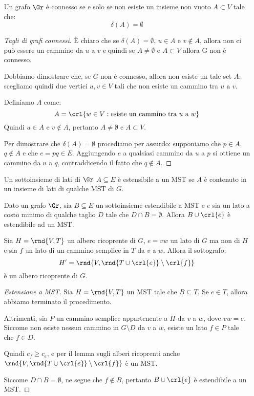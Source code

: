 \documentclass[\main/main.tex]{subfiles}
\begin{document}
\begin{theorem}
  Un grafo \(\Gr \) è connesso se e solo se non esiste un insieme non vuoto \(A \subset V\) tale che:
  \[
    \delta(A) = \emptyset
  \]
\end{theorem}
\begin{proof}[Tagli di grafi connessi]
  È chiaro che se \(\delta(A) = \emptyset \), \(u \in A\) e \(v \not\in A\), allora non ci può essere un cammino da \(u\) a \(v\) e quindi se \(A \neq \emptyset \) e \(A \subset V\) allora G non è connesso.

  Dobbiamo dimostrare che, se \(G\) non è connesso, allora non esiste un tale set \(A\): scegliamo quindi due vertici \(u, v \in V\) tali che non esiste un cammino tra \(u\) a \(v\).

  Definiamo \(A\) come:
  \[
    A = \crl{w \in V: \text{esiste un cammino tra \(u\) a \(w\)}}
  \]
  Quindi \(u \in A\) e \(v \not\in A\), pertanto \(A \neq \emptyset \) e \(A \subset V\).

  Per dimostrare che \(\delta(A) = \emptyset \) procediamo per assurdo: supponiamo che \(p \in A\), \(q \not\in A\) e che \(e = pq \in E\). Aggiungendo \(e\) a qualsiasi cammino da \(u\) a \(p\) si ottiene un cammino da \(u\) a \(q\), contraddicendo il fatto che \(q \not\in A\).
\end{proof}
\begin{definition}
  Un sottoinsieme di lati di \(\Gr \) \(A \subseteq E\) è estensibile a un MST se \(A\) è contenuto in un insieme di lati di qualche MST di \(G\).
\end{definition}
\begin{theorem}
  Dato un grafo \(\Gr \), sia \(B \subseteq E\) un sottoinsieme estendibile a MST e \(e\) sia un lato a costo minimo di qualche taglio \(D\) tale che \(D \cap B = \emptyset \). Allora \(B \cup \crl{e}\) è estendibile ad un MST.
\end{theorem}
\begin{lemma}
  Sia \(H = \rnd{V, T}\) un albero ricoprente di \(G\), \(e = vw\) un lato di \(G\) ma non di \(H\) e sia \(f\) un lato di un cammino semplice in \(T\) da \(v\) a \(w\). Allora il sottografo:
  \[
    H' = \rnd{V, \rnd{T \cup \crl{e}}\setminus \crl{f}}
  \]
  è un albero ricoprente di \(G\).
\end{lemma}
\begin{proof}[Estensione a MST]
  Sia \(H = \rnd{V, T}\) un MST tale che \(B \subseteq T\). Se \(e \in T\), allora abbiamo terminato il procedimento.

  Altrimenti, sia \(P\) un cammino semplice appartenente a \(H\) da \(v\) a \(w\), dove \(vw = e\). Siccome non esiste nessun cammino in \(G\setminus D\) da \(v\) a \(w\), esiste un lato \(f \in P\) tale che \(f \in D\).

  Quindi \(c_f \geq c_e\), e per il lemma sugli alberi ricoprenti anche \(\rnd{V, \rnd{T \cup \crl{e}} \setminus \crl{f}}\) è un MST.

  Siccome \(D \cap B = \emptyset \), ne segue che \(f \not\in B\), pertanto \(B \cup \crl{e}\) è estendibile a un MST.
\end{proof}
\end{document}
